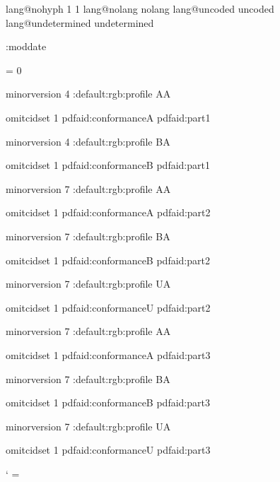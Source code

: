 \ifcsname lang@nohyph\endcsname \else
     1 1 \fi
\ifcsname lang@nolang\endcsname \else
     {nolang} \fi
\ifcsname lang@uncoded\endcsname \else
     {uncoded} \fi
\ifcsname lang@undetermined\endcsname \else
     {undetermined} \fi



\newtoks\setembeddedfilesmoddate
    \setembeddedfilesmoddate{}
\newtoks\embeddedfiles:moddate
\def\minim:makedefaultmoddate{%
    \expandafter\edef\expandafter
        \minim:tmp\expandafter{\the\setembeddedfilesmoddate}%
    \embeddedfiles:moddate\expandafter{\minim:tmp}}


\newcount \pdfaconformancelevel
\pdfaconformancelevel = 0

\def\pdfalevel#1#2{%
    \global\pdfaconformancelevel=#1\relax
    \ifcsname minim:pdfa:#1#2\endcsname \lastnamedcs\else
        \errmessage{Unknown pdf/a standard pdf/a-#1}\fi}

\def\minim:pdfasettings#1#2#3{%
    \pdfvariable minorversion #1\relax
    \minim:default:rgb:profile
    \if#2A\writedocumentstructure1\fi
    
    \pdfvariable omitcidset 1
    \setmetadata pdfaid:conformance{#2}%
    \setmetadata pdfaid:part{#3}}

\expandafter\def\csname minim:pdfa:1a\endcsname{\minim:pdfasettings 4A1}
\expandafter\def\csname minim:pdfa:1b\endcsname{\minim:pdfasettings 4B1}
\expandafter\def\csname minim:pdfa:2a\endcsname{\minim:pdfasettings 7A2}
\expandafter\def\csname minim:pdfa:2b\endcsname{\minim:pdfasettings 7B2}
\expandafter\def\csname minim:pdfa:2u\endcsname{\minim:pdfasettings 7U2}
\expandafter\def\csname minim:pdfa:3a\endcsname{\minim:pdfasettings 7A3}
\expandafter\def\csname minim:pdfa:3b\endcsname{\minim:pdfasettings 7B3}
\expandafter\def\csname minim:pdfa:3u\endcsname{\minim:pdfasettings 7U3}


\catcode`\: = \minimpdfloaded

